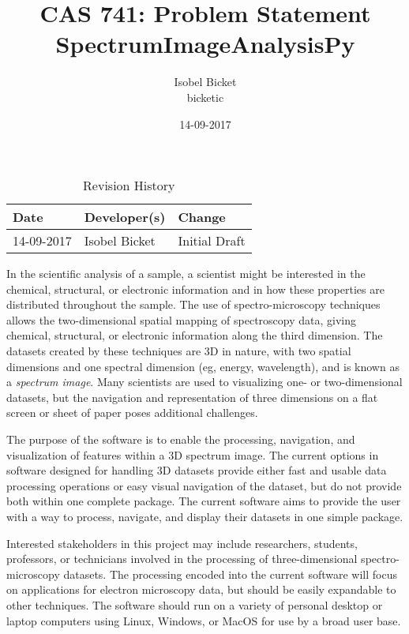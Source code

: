 \documentclass{article}
\title{CAS 741: Problem Statement\\SpectrumImageAnalysisPy}
\author{Isobel Bicket\\bicketic}
\date{14-09-2017}
\begin{document}
\maketitle

\begin{table}[hp]
\caption{Revision History} \label{TblRevisionHistory}
\begin{tabularx}{\textwidth}{llX}
\toprule
\textbf{Date} & \textbf{Developer(s)} & \textbf{Change}\\
\midrule
14-09-2017 & Isobel Bicket & Initial Draft\\

\bottomrule
\end{tabularx}
\end{table}

In the scientific analysis of a sample, a scientist might be interested in the chemical, structural, or electronic information and in how these properties are distributed throughout the sample. The use of spectro-microscopy techniques allows the two-dimensional spatial mapping of spectroscopy data, giving chemical, structural, or electronic information along the third dimension. The datasets created by these techniques are 3D in nature, with two spatial dimensions and one spectral dimension (eg, energy, wavelength), and is known as a \textit{spectrum image}. Many scientists are used to visualizing one- or two-dimensional datasets, but the navigation and representation of three dimensions on a flat screen or sheet of paper poses additional challenges.

The purpose of the software is to enable the processing, navigation, and visualization of features within a 3D spectrum image. The current options in software designed for handling 3D datasets provide either fast and usable data processing operations or easy visual navigation of the dataset, but do not provide both within one complete package. The current software aims to provide the user with a way to process, navigate, and display their datasets in one simple package. 

Interested stakeholders in this project may include researchers, students, professors, or technicians involved in the processing of three-dimensional spectro-microscopy datasets. The processing encoded into the current software will focus on applications for electron microscopy data, but should be easily expandable to other techniques. The software should run on a variety of personal desktop or laptop computers using Linux, Windows, or MacOS for use by a broad user base.

\end{document}
